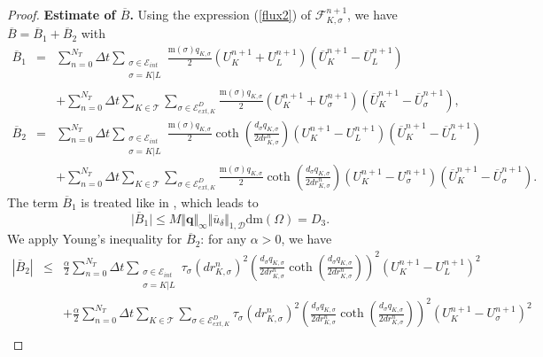 \documentclass[smallextended]{svjour3}
\begin{document}
\begin{proof}
\textbf{Estimate of $\overline{B}$.} Using the expression (\ref{flux2}) of $\mathcal{F}_{K,\sigma}^{n+1}$, we have $\overline{B}=\overline{B}_{1}+\overline{B}_{2}$ with
\begin{eqnarray*}
\overline{B}_{1}&=& \sum_{n=0}^{N_{T}} \Delta t \sum_{\substack{\sigma \in \mathcal{E}_{int} \\ \sigma=K|L}} \frac{\text{m}(\sigma)q_{K,\sigma}}{2}\left(U_{K}^{n+1}+U_{L}^{n+1}\right)\left(\overline{U}_{K}^{n+1}-\overline{U}_{L}^{n+1}\right) \\
& & + \sum_{n=0}^{N_{T}} \Delta t \sum_{K \in \mathcal{T}} \sum_{\sigma \in \mathcal{E}_{ext,K}^{D}}\frac{\text{m}(\sigma)q_{K,\sigma}}{2}\left(U_{K}^{n+1}+U_{\sigma}^{n+1}\right)\left(\overline{U}_{K}^{n+1}-\overline{U}_{\sigma}^{n+1}\right),\\
\overline{B}_{2}&=& \sum_{n=0}^{N_{T}} \Delta t \sum_{\substack{\sigma \in \mathcal{E}_{int} \\ \sigma=K|L}} \frac{\text{m}(\sigma)q_{K,\sigma}}{2}\coth\left(\frac{d_{\sigma}q_{K,\sigma}}{2dr^{n}_{K,\sigma}}\right)\left(U_{K}^{n+1}-U_{L}^{n+1}\right)\left(\overline{U}_{K}^{n+1}-\overline{U}_{L}^{n+1}\right)\\
& & + \sum_{n=0}^{N_{T}} \Delta t \sum_{K \in \mathcal{T}} \sum_{\sigma \in \mathcal{E}_{ext,K}^{D}}\frac{\text{m}(\sigma)q_{K,\sigma}}{2}\coth\left(\frac{d_{\sigma}q_{K,\sigma}}{2dr^{n}_{K,\sigma}}\right)\left(U_{K}^{n+1}-U_{\sigma}^{n+1}\right)\left(\overline{U}_{K}^{n+1}-\overline{U}_{\sigma}^{n+1}\right).
\end{eqnarray*}
The term $\overline{B}_{1}$ is treated like in \cite{Eymard2006}, which leads to
\begin{equation*}
\vert \overline{B}_{1} \vert \leq M \Vert \textbf{q} \Vert_{\infty}\Vert \overline{u}_{\delta} \Vert_{1,\mathcal{D}}\text{dm}(\Omega)=D_{3}.
\end{equation*}
We apply Young's inequality for $\overline{B}_{2}$: for any $\alpha>0$, we have
\begin{eqnarray*}
\left\vert \overline{B}_{2} \right\vert &\leq &\frac{\alpha}{2} \sum_{n=0}^{N_{T}} \Delta t \sum_{\substack{\sigma \in \mathcal{E}_{int} \\ \sigma=K|L}} \tau_{\sigma}\left(dr_{K,\sigma}^{n}\right)^{2}\left(\frac{d_{\sigma}q_{K,\sigma}}{2dr_{K,\sigma}^{n}}\coth\left(\frac{d_{\sigma}q_{K,\sigma}}{2dr^{n}_{K,\sigma}}\right)\right)^{2}\left(U_{K}^{n+1}-U_{L}^{n+1}\right)^{2}\\
& & + \frac{\alpha}{2} \sum_{n=0}^{N_{T}} \Delta t \sum_{K \in \mathcal{T}} \sum_{\sigma \in \mathcal{E}_{ext,K}^{D}} \tau_{\sigma}\left(dr_{K,\sigma}^{n}\right)^{2} \left(\frac{d_{\sigma}q_{K,\sigma}}{2dr^{n}_{K,\sigma}}\coth\left(\frac{d_{\sigma}q_{K,\sigma}}{2dr^{n}_{K,\sigma}}\right)\right)^{2}\left(U_{K}^{n+1}-U_{\sigma}^{n+1}\right)^{2}\\

\end{eqnarray*}
\end{proof}
\end{document}
